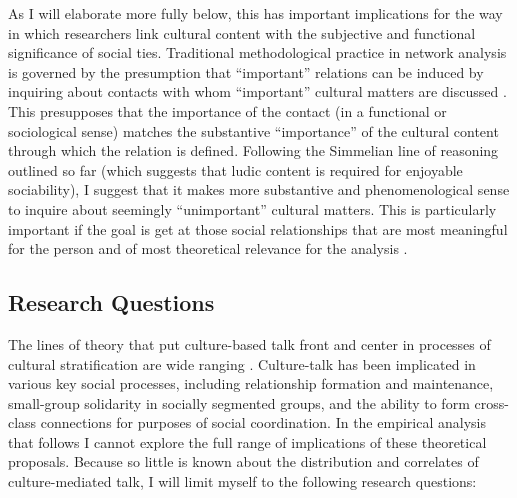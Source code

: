 \documentclass[11pt]{article}
\begin{document}
As I will elaborate more fully  below, this has important implications for the way in which researchers link cultural content with the subjective and functional significance of social ties.  Traditional methodological practice in network analysis is governed by the presumption that ``important'' relations can be induced by inquiring about contacts with whom ``important'' cultural matters are discussed \citep{burt84, marsden87}.   This presupposes that the importance of the contact (in a functional or sociological sense) matches the substantive ``importance'' of the cultural content through which the relation is defined. Following the Simmelian line of reasoning outlined so far (which suggests that ludic content is required for enjoyable sociability), I suggest that it makes more substantive and phenomenological sense to inquire about seemingly ``unimportant'' cultural matters.  This is particularly important if the goal is get at those social relationships that are most meaningful for the person and of most theoretical relevance for the analysis \citep{pachuki_breiger10, mische10}.

\subsection{Research Questions}
The lines of theory that put culture-based talk front and center in processes of cultural stratification are wide ranging \citep{collins75, collins04, fine77, simmel49, kadushin66, dimaggio87, lizardo06a, erickson96, witte_ryan04}.  Culture-talk has been implicated in various key social processes, including relationship formation and maintenance, small-group solidarity in socially segmented groups, and the ability to form cross-class connections for purposes of social coordination.  In the empirical analysis that follows I cannot explore the full range of implications of these theoretical proposals.  Because so little is known about the distribution and correlates of culture-mediated talk, I will limit myself to the following research questions:
\end{document}
